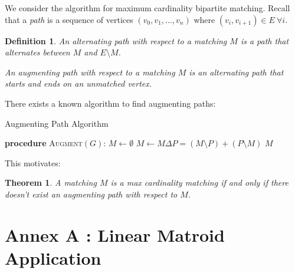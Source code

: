 \documentclass{report}
\newcommand{\takes}{\ensuremath{\leftarrow}}
\newtheorem{definition}{Definition}
\newtheorem{theorem}{Theorem}
\begin{document}
  We consider the algorithm for maximum cardinality bipartite matching. Recall that a \emph{path} is a sequence of vertices $(v_0, v_1, ..., v_n)$ where $(v_i, v_{i + 1}) \in E \ \forall i$.
  \begin{definition}
    An \emph{alternating path} with respect to a matching $M$ is a path that alternates between $M$ and $E \setminus M$.

    An \emph{augmenting path} with respect to a matching $M$ is an alternating path that starts and ends on an unmatched vertex.
  \end{definition}

  There exists a known algorithm to find augmenting paths:
  \begin{center}
    \begin{minipage}{.9\linewidth}
      \begin{algorithm}[H]
        \caption{Augmenting Path Algorithm}
        \label{AugmentingPaths}
        \begin{algorithmic}[1]
          \item[] \textbf{procedure} \textsc{Augment}$(G)$:
          \STATE $M \takes \emptyset$
            \STATE $M \takes M \Delta P = (M \setminus P) + (P \setminus M)$
          \ENDWHILE
          \RETURN $M$
        \end{algorithmic}
      \end{algorithm}
    \end{minipage}
  \end{center}

  This motivates:
  \begin{theorem}
    A matching $M$ is a max cardinality matching if and only if there doesn't exist an augmenting path with respect to $M$.
  \end{theorem}

  \chapter*{Annex A : Linear Matroid Application}
\end{document}
